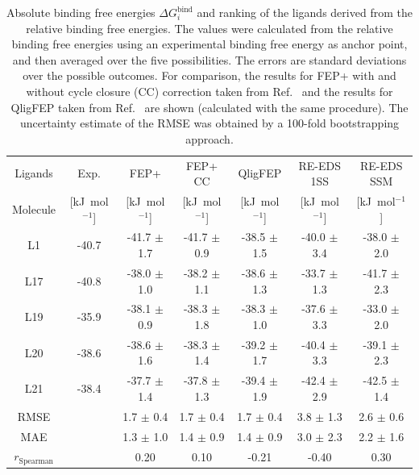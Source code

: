 \begin{table}[h]
\caption{Absolute binding free energies $\Delta G_{i}^{\text{bind}}$ and ranking of the ligands derived from the relative binding free energies. The values were calculated from the relative binding free energies using an experimental binding free energy as anchor point, and then averaged over the five possibilities. The errors are standard deviations over the possible outcomes. For comparison, the results for FEP+ with and without cycle closure (CC) correction taken from Ref.~\cite{Wang2017} and the results for QligFEP taken from Ref.~\cite{Jespers2019} are shown (calculated with the same procedure). The uncertainty estimate of the RMSE was obtained by a 100-fold bootstrapping approach.}
\begin{center}
\footnotesize
\begin{adjustbox}{max width=\textwidth}
\begin{tabular}{ c |c |c|c|c|c|c}
  Ligands & \multicolumn{1}{c|}{Exp. \cite{Huang2012}} &\multicolumn{1}{c|}{FEP+ \cite{Wang2017}}&\multicolumn{1}{c|}{FEP+ CC \cite{Wang2017}}&\multicolumn{1}{c|}{QligFEP \cite{Jespers2019}}&\multicolumn{1}{c|}{RE-EDS 1SS}&\multicolumn{1}{c}{RE-EDS SSM}\\ 
    Molecule & [kJ~mol$^{-1}$]  & [kJ~mol$^{-1}$] & [kJ~mol$^{-1}$] & [kJ~mol$^{-1}$] & [kJ~mol$^{-1}$] & [kJ~mol$^{-1}$]  \\
  \hline
        L1 &   -40.7 & -41.7 $\pm$ 1.7         & -41.7 $\pm$ 0.9         & -38.5 $\pm$ 1.5 &   -40.0 $\pm$ 3.4 &    -38.0 $\pm$ 2.0 \\
        L17 &  -40.8 &  -38.0 $\pm$ 1.0         & -38.2 $\pm$ 1.1         & -38.6 $\pm$ 1.3 &    -33.7 $\pm$ 1.3 & -41.7 $\pm$ 2.3 \\
        L19 &  -35.9  & -38.1 $\pm$ 0.9         & -38.3 $\pm$ 1.8         & -38.3 $\pm$ 1.0 &   -37.6 $\pm$ 3.3 &  -33.0 $\pm$ 2.0 \\
        L20 &  -38.6 & -38.6  $\pm$ 1.6         & -38.3 $\pm$ 1.4         & -39.2 $\pm$ 1.7 &    -40.4 $\pm$ 3.3 & -39.1 $\pm$ 2.3 \\
        L21 &  -38.4 & -37.7  $\pm$ 1.4         & -37.8 $\pm$ 1.3         & -39.4 $\pm$ 1.9 &    -42.4 $\pm$ 2.9 &    -42.5 $\pm$ 1.4 \\
    \hline
        RMSE &                    & 1.7  $\pm$  0.4        & 1.7   $\pm$ 0.4        & 1.7 $\pm$ 0.4          & 3.8 $\pm$ 1.3         & 2.6 $\pm$ 0.6 \\
        MAE &                     & 1.3 $\pm$ 1.0  & 1.4 $\pm$ 0.9 & 1.4 $\pm$ 0.9 & 3.0 $\pm$ 2.3 & 2.2 $\pm$ 1.6 \\
        $r_{\text{Spearman}}$ &  & 0.20           & 0.10          & -0.21         &  -0.40           & 0.30 \\
\end{tabular}
\end{adjustbox}
\end{center}
\label{tab:RE-EDS_FE_RingCycleOpening_absoluteShiftDF}
\end{table}

\FloatBarrier